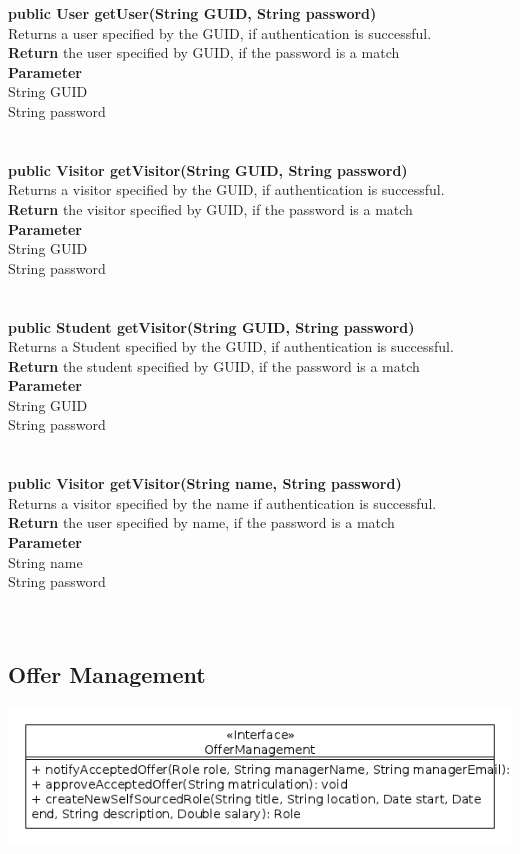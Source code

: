\documentclass{l3deliverable}
\begin{document}
\textbf{public User getUser(String GUID, String password)}\\
Returns a user specified by the GUID, if authentication is successful.\\
\textbf{Return} the user specified by GUID, if the password is a match\\
\textbf{Parameter}\\
String GUID\\
String password\\
\\
\\
\textbf{public Visitor getVisitor(String GUID, String password)}\\
Returns a visitor specified by the GUID, if authentication is successful.\\
\textbf{Return} the visitor specified by GUID, if the password is a match\\
\textbf{Parameter}\\
String GUID\\
String password\\
\\
\\
\textbf{public Student getVisitor(String GUID, String password)}\\
Returns a Student specified by the GUID, if authentication is successful.\\
\textbf{Return} the student specified by GUID, if the password is a match\\
\textbf{Parameter}\\
String GUID\\
String password\\
\\
\\
\textbf{public Visitor getVisitor(String name, String password)}\\
Returns a visitor specified by the name if authentication is successful.\\
\textbf{Return} the user specified by name, if the password is a match\\
\textbf{Parameter}\\
String name\\
String password\\
\\
\\
\subsection{Offer Management}
\includegraphics[scale = 0.5]{OfferManagement.png}
\\
\end{document}
